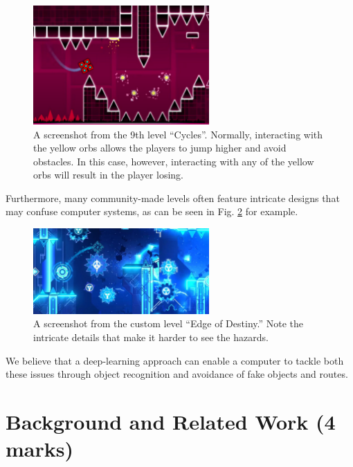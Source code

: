 \documentclass{article} %
\begin{document}
\begin{figure}[!h]
\begin{center}
\includegraphics[width=0.6\textwidth]{Figs/GeoDash_Cycles_False_jump.png}
\end{center}
\caption{A screenshot from the 9th level “Cycles”. 
Normally, interacting with the yellow orbs allows the
players to jump higher and avoid obstacles. In this case, 
however, interacting with any of the yellow orbs will result 
in the player losing. \citep{GD+cycles+screenshot}}
\label{fig:cycles_false_jump_img}
\end{figure}

Furthermore, many community-made levels often feature 
intricate designs that may confuse computer systems, as 
can be seen in Fig. \ref{fig:edge_of_destiny} for example.

\begin{figure}[!h]
\begin{center}
\includegraphics[width=0.6\textwidth]{Figs/GeoDash_Level_ex.png}
\end{center}
\caption{A screenshot from the custom level “Edge of Destiny.” 
Note the intricate details that make it harder to see the hazards. 
\citep{GD+edge_of_destiny}}
\label{fig:edge_of_destiny}
\end{figure}

We believe that a deep-learning approach can enable a computer 
to tackle both these issues through object recognition and avoidance 
of fake objects and routes.

\section{Background and Related Work (4 marks)}
\end{document}
